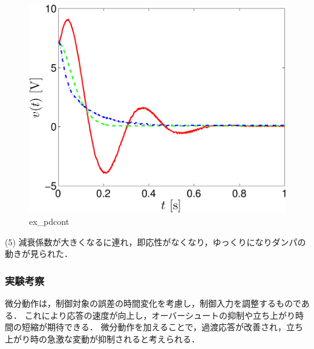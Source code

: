 \begin{figure}[h]
  \centering
  \includegraphics[scale=0.5]{sozai/figure_pdcont_volt-crop.pdf}
  \caption{ex\_pdcont}
\end{figure}

\newpage

(5) 減衰係数が大きくなるに連れ，即応性がなくなり，ゆっくりになりダンパの動きが見られた．

\subsubsection{実験考察}
微分動作は，制御対象の誤差の時間変化を考慮し，制御入力を調整するものである．
これにより応答の速度が向上し，オーバーシュートの抑制や立ち上がり時間の短縮が期待できる．
微分動作を加えることで，過渡応答が改善され，立ち上がり時の急激な変動が抑制されると考えられる．

